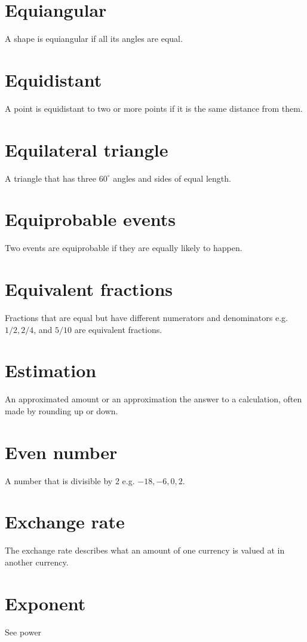 \documentclass[10pt]{article}
\begin{document}
\section*{Equiangular}
A shape is equiangular if all its angles are equal.

\section*{Equidistant}
A point is equidistant to two or more points if it is the same distance from them.

\section*{Equilateral triangle}
A triangle that has three $60^{\circ}$ angles and sides of equal length.

\section*{Equiprobable events}
Two events are equiprobable if they are equally likely to happen.

\section*{Equivalent fractions}
Fractions that are equal but have different numerators and denominators e.g. $1 / 2,2 / 4$, and $5 / 10$ are equivalent fractions.

\section*{Estimation}
An approximated amount or an approximation the answer to a calculation, often made by rounding up or down.

\section*{Even number}
A number that is divisible by 2 e.g. $-18,-6,0,2$.

\section*{Exchange rate}
The exchange rate describes what an amount of one currency is valued at in another currency.

\section*{Exponent}
See power
\end{document}
